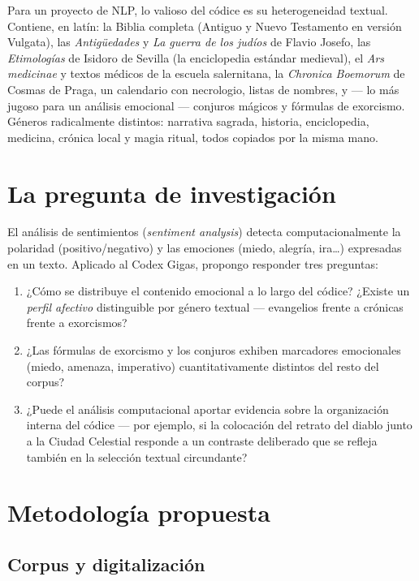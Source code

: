 \documentclass[11pt]{article}
\begin{document}
Para un proyecto de NLP, lo valioso del códice es su heterogeneidad textual. Contiene, en
latín: la Biblia completa (Antiguo y Nuevo Testamento en versión Vulgata), las
\emph{Antigüedades} y \emph{La guerra de los judíos} de Flavio Josefo, las \emph{Etimologías}
de Isidoro de Sevilla (la enciclopedia estándar medieval), el \emph{Ars medicinae} y textos
médicos de la escuela salernitana, la \emph{Chronica Boemorum} de Cosmas de Praga, un
calendario con necrologio, listas de nombres, y --- lo más jugoso para un análisis emocional
--- conjuros mágicos y fórmulas de exorcismo. Géneros radicalmente distintos: narrativa
sagrada, historia, enciclopedia, medicina, crónica local y magia ritual, todos copiados por
la misma mano.

\section{La pregunta de investigación}

El análisis de sentimientos (\emph{sentiment analysis}) detecta computacionalmente la
polaridad (positivo/negativo) y las emociones (miedo, alegría, ira\ldots) expresadas en un
texto. Aplicado al Codex Gigas, propongo responder tres preguntas:

\begin{enumerate}
  \item ¿Cómo se distribuye el contenido emocional a lo largo del códice? ¿Existe un
        \emph{perfil afectivo} distinguible por género textual --- evangelios frente a
        crónicas frente a exorcismos?
  \item ¿Las fórmulas de exorcismo y los conjuros exhiben marcadores emocionales
        (miedo, amenaza, imperativo) cuantitativamente distintos del resto del corpus?
  \item ¿Puede el análisis computacional aportar evidencia sobre la organización interna
        del códice --- por ejemplo, si la colocación del retrato del diablo junto a la
        Ciudad Celestial responde a un contraste deliberado que se refleja también en la
        selección textual circundante?
\end{enumerate}

\section{Metodología propuesta}

\subsection{Corpus y digitalización}
\end{document}
